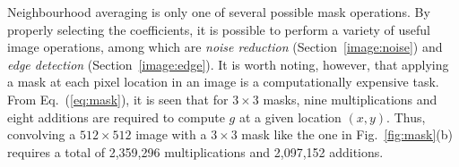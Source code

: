Neighbourhood averaging is only one of several possible mask
operations.  By properly selecting the coefficients, it is possible to
perform a variety of useful image operations, among which are {\em
  noise reduction\/} (Section~\ref{image:noise}) and {\em edge
  detection\/} (Section~\ref{image:edge}).  It is worth noting,
however, that applying a mask at each pixel location in an image is a
computationally expensive task.  From Eq.~(\ref{eq:mask}), it is seen
that for $3\times 3$ masks, nine multiplications and eight additions
are required to compute $g$ at a given location $(x,y)$.  Thus,
convolving a $512\times 512$ image with a $3\times 3$ mask like the
one in Fig.~\ref{fig:mask}(b) requires a total of 2,359,296
multiplications and 2,097,152 additions.

